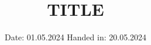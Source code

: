 

\subject{LAB REPORT}
\title{TITLE}
\date{%
  Date: 01.05.2024
  \hspace{3em}
  Handed in: 20.05.2024
}



\maketitle
\thispagestyle{empty}
\tableofcontents
\newpage






\printbibliography{}


